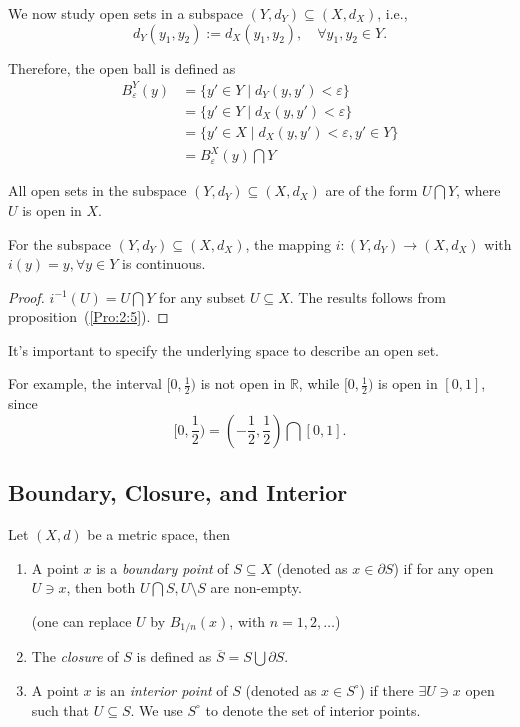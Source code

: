 We now study open sets in a subspace $(Y,d_Y)\subseteq(X,d_X)$, i.e.,
\[
d_Y(y_1,y_2):=d_X(y_1,y_2),\quad
\forall y_1,y_2\in Y.
\]

Therefore, the open ball is defined as
\begin{align*}
B_\varepsilon^Y(y)&=\{y'\in Y\mid d_Y(y,y')<\varepsilon\}\\
&=\{y'\in Y\mid d_X(y,y')<\varepsilon\}\\
&=\{y'\in X\mid d_X(y,y')<\varepsilon, y'\in Y\}\\
&=B_\varepsilon^X(y)\bigcap Y
\end{align*}
\begin{proposition}
All open sets in the subspace $(Y,d_Y)\subseteq (X,d_X)$ are of the form $U\bigcap Y$, where $U$ is open in $X$.
\end{proposition}
\begin{corollary}
For the subspace $(Y,d_Y)\subseteq (X,d_X)$, the mapping $i:(Y,d_Y)\to(X,d_X)$ with $i(y)=y,\forall y\in Y$ is continuous.
\end{corollary}
\begin{proof}
$i^{-1}(U)=U\bigcap Y$ for any subset $U\subseteq X$. The results follows from proposition~(\ref{Pro:2:5}).
\end{proof}

\begin{remark}
It's important to specify the underlying space to describe an open set. 

For example, the interval $[0,\frac{1}{2})$ is not open in $\mathbb{R}$, while $[0,\frac{1}{2})$ is open in $[0,1]$, since
\[
[0,\frac{1}{2})
=
(-\frac{1}{2},\frac{1}{2})
\bigcap
[0,1].
\]
\end{remark}

\subsection{Boundary, Closure, and Interior}

\begin{definition}
Let $(X,d)$ be a metric space, then
\begin{enumerate}
\item
A point $x$ is a \emph{boundary point} of $S\subseteq X$ (denoted as $x\in\partial S$)
if for any open $U\ni x$, then both $U\bigcap S,U\setminus S$ are non-empty.

(one can replace $U$ by $B_{1/n}(x)$, with $n=1,2,\dots$)
\item
The \emph{closure} of $S$ is defined as $\overline{S}=S\bigcup\partial S$.
\item
A point $x$ is an \emph{interior point} of $S$ (denoted as $x\in S^\circ$) 
if there $\exists U\ni x$ open such that $U\subseteq S$. We use $S^\circ$ to denote the set of interior points.
\end{enumerate}
\end{definition}

